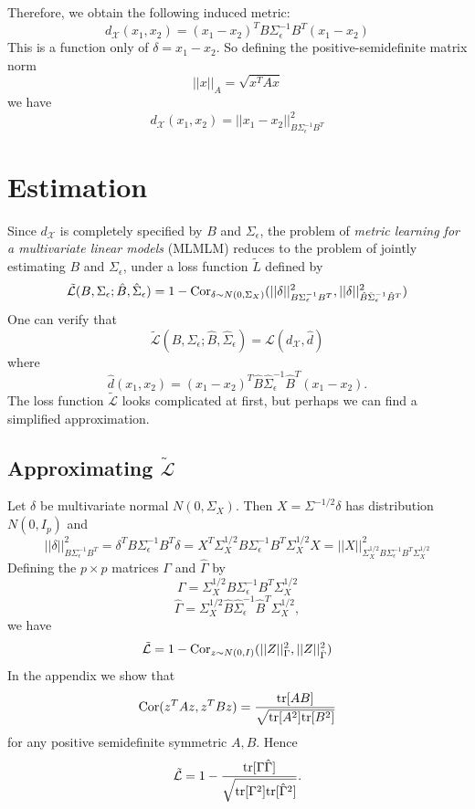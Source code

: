 \documentclass[12pt]{article}
\begin{document}
Therefore, we obtain the following induced metric:
\[
d_\mathcal{X}(x_1,x_2) = (x_1-x_2)^T B \Sigma_\epsilon^{-1} B^T (x_1 - x_2)
\]
This is a function only of $\delta = x_1 - x_2$.
So defining the
positive-semidefinite matrix norm
\[
||x||_A = \sqrt{x^T A x}
\]
we have
\[
d_\mathcal{X}(x_1,x_2) = ||x_1 - x_2||^2_{B\Sigma_\epsilon^{-1}B^T}
\]

\section{Estimation}

Since $d_\mathcal{X}$ is completely specified by $B$ and
$\Sigma_\epsilon$, the problem of \emph{metric
learning for a multivariate linear models} (MLMLM) reduces to the
problem of jointly estimating $B$ and $\Sigma_\epsilon$, under a loss
function $\tilde{L}$ defined by
\[
\tilde{\mathcal{L}}(B, \Sigma_\epsilon; \hat{B}, \hat{\Sigma}_\epsilon) = 
1 - \text{Cor}_{\delta \sim N(0, \Sigma_X)}(||\delta||^2_{B\Sigma_\epsilon^{-1}B^T},
||\delta||^2_{\hat{B}\hat{\Sigma}_\epsilon^{-1}\hat{B}^T})
\]
One can verify that
\[
\tilde{\mathcal{L}}(B, \Sigma_\epsilon; \hat{B}, \hat{\Sigma}_\epsilon) 
= \mathcal{L}(d_\mathcal{X}, \hat{d})
\]
where
\[
\hat{d}(x_1, x_2) =  (x_1-x_2)^T \hat{B} \hat{\Sigma}_\epsilon^{-1} \hat{B}^T (x_1 - x_2).
\]
The loss function $\tilde{\mathcal{L}}$ looks complicated at first,
but perhaps we can find a simplified approximation.

\subsection{Approximating $\tilde{\mathcal{L}}$}

Let $\delta$ be multivariate normal $N(0, \Sigma_X)$.
Then $X = \Sigma^{-1/2}\delta$ has distribution $N(0, I_p)$
and
\[
||\delta||^2_{B\Sigma_\epsilon^{-1}B^T}
= \delta^T B\Sigma_\epsilon^{-1}B^T \delta
= X^T \Sigma_X^{1/2}B\Sigma_\epsilon^{-1}B^T \Sigma_X^{1/2} X
= ||X||^2_{\Sigma_X^{1/2}B\Sigma_\epsilon^{-1}B^T \Sigma_X^{1/2}}
\]
Defining the $p \times p$ matrices $\Gamma$ and $\hat{\Gamma}$ by
\[\Gamma = \Sigma_X^{1/2}B\Sigma_\epsilon^{-1}B^T \Sigma_X^{1/2}\]
\[\hat{\Gamma}
 = \Sigma_X^{1/2}\hat{B}\hat{\Sigma}_\epsilon^{-1}\hat{B}^T \Sigma_X^{1/2},\]
we have
\[
\tilde{\mathcal{L}} = 
1 - \text{Cor}_{z \sim N(0, I)}(||Z||^2_\Gamma, ||Z||^2_{\hat{\Gamma}})
\]
In the appendix we show that
\[
\text{Cor}(z^T A z, z^T B z) = \frac{\text{tr}[AB]}{\sqrt{\text{tr}[A^2]\text{tr}[B^2]}}
\]
for any positive semidefinite symmetric $A, B$.
Hence
\[
\tilde{\mathcal{L}} = 1 - \frac{\text{tr}[\Gamma\hat{\Gamma}]}{\sqrt{\text{tr}[\Gamma^2]\text{tr}[\hat{\Gamma}^2]}}.
\]
\end{document}
